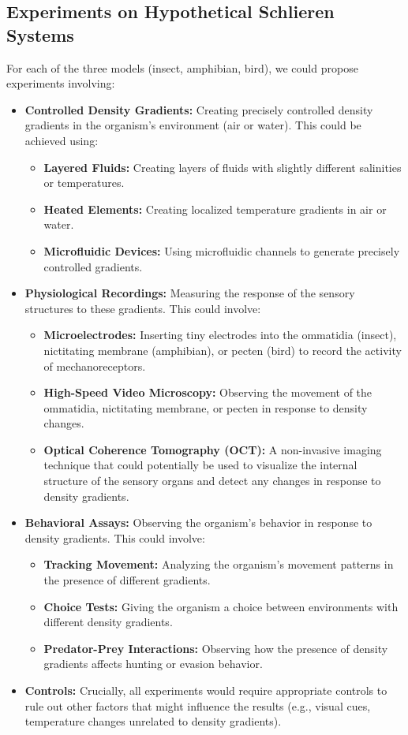 \documentclass[11pt]{article}
\begin{document}
\subsection{Experiments on Hypothetical Schlieren Systems}

For each of the three models (insect, amphibian, bird), we could propose experiments involving:
\begin{itemize}
    \item \textbf{Controlled Density Gradients:} Creating precisely controlled density gradients in the organism's environment (air or water). This could be achieved using:
    \begin{itemize}
        \item \textbf{Layered Fluids:} Creating layers of fluids with slightly different salinities or temperatures.
        \item \textbf{Heated Elements:} Creating localized temperature gradients in air or water.
        \item \textbf{Microfluidic Devices:} Using microfluidic channels to generate precisely controlled gradients.
    \end{itemize}
    \item \textbf{Physiological Recordings:} Measuring the response of the sensory structures to these gradients. This could involve:
    \begin{itemize}
        \item \textbf{Microelectrodes:} Inserting tiny electrodes into the ommatidia (insect), nictitating membrane (amphibian), or pecten (bird) to record the activity of mechanoreceptors.
        \item \textbf{High-Speed Video Microscopy:} Observing the movement of the ommatidia, nictitating membrane, or pecten in response to density changes.
        \item \textbf{Optical Coherence Tomography (OCT):} A non-invasive imaging technique that could potentially be used to visualize the internal structure of the sensory organs and detect any changes in response to density gradients.
    \end{itemize}
    \item \textbf{Behavioral Assays:} Observing the organism's behavior in response to density gradients. This could involve:
    \begin{itemize}
        \item \textbf{Tracking Movement:} Analyzing the organism's movement patterns in the presence of different gradients.
        \item \textbf{Choice Tests:} Giving the organism a choice between environments with different density gradients.
        \item \textbf{Predator-Prey Interactions:} Observing how the presence of density gradients affects hunting or evasion behavior.
    \end{itemize}
    \item \textbf{Controls:} Crucially, all experiments would require appropriate controls to rule out other factors that might influence the results (e.g., visual cues, temperature changes unrelated to density gradients).
\end{itemize}
\end{document}
